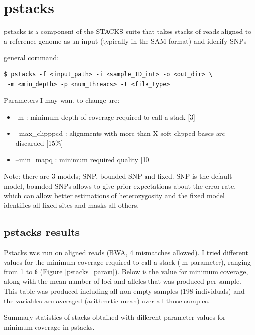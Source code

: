 \documentclass[10pt,a4paper]{report}
\begin{document}
\section{pstacks}

pstacks is a component of the STACKS suite that takes stacks of reads aligned to a reference genome as an input (typically in the SAM format) and idenify SNPs

general command: 
\begin{lstlisting}
$ pstacks -f <input_path> -i <sample_ID_int> -o <out_dir> \
 -m <min_depth> -p <num_threads> -t <file_type>
\end{lstlisting}

Parameters I may want to change are: 
\begin{itemize}
\item -m : minimum depth of coverage required to call a stack [3]
\item --max\_clippped : alignments with more than X soft-clipped bases are discarded [15\%]
\item --min\_mapq : minimum required quality [10]
\end{itemize}

Note: there are 3 models; SNP, bounded SNP and fixed. SNP is the default model, bounded SNPs allows to give prior expectations about the error rate, which can allow better estimations of heterozygosity and the fixed model identifies all fixed sites and masks all others.

\subsection{pstacks results}

Pstacks was run on aligned reads (BWA, 4 mismatches allowed). I tried different values for the minimum coverage required to call a stack (-m parameter), ranging from 1 to 6 (Figure \ref{pstacks_param}). Below is the value for minimum coverage, along with the mean number of loci and alleles that was produced per sample. This table was produced including all non-empty samples (198 individuals) and the variables are averaged (arithmetic mean) over all those samples.

\begin{table}
\begin{center}
\vspace{10px}
\vspace{10px}
\caption{Summary statistics of stacks obtained with different parameter values for minimum coverage in pstacks.}
\label{pstacks_param}
\end{center}
\end{table}
\end{document}
